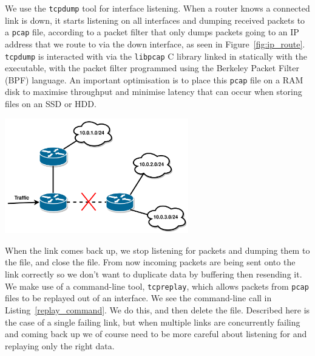 \documentclass[withindex,glossary,openany]{cam-thesis}
\begin{document}
We use the \texttt{tcpdump} tool for interface listening. When a router knows a connected link is down, it starts listening on all interfaces and dumping received packets to a \texttt{pcap} file, according to a packet filter that only dumps packets going to an IP address that we route to via the down interface, as seen in Figure~\ref{fig:ip_route}. \texttt{tcpdump} is interacted with via the \texttt{libpcap} C library linked in statically with the executable, with the packet filter programmed using the Berkeley Packet Filter (BPF) language. An important optimisation is to place this \texttt{pcap} file on a RAM disk to maximise throughput and minimise latency that can occur when storing files on an SSD or HDD.

\begin{center}
\begin{minipage}{0.9\textwidth} \centering
	\includegraphics[width=0.6\textwidth]{ip_route}
	\label{fig:ip_route}
\end{minipage}
\end{center}

When the link comes back up, we stop listening for packets and dumping them to the file, and close the file. From now incoming packets are being sent onto the link correctly so we don't want to duplicate data by buffering then resending it. We make use of a command-line tool, \texttt{tcpreplay}, which allows packets from \texttt{pcap} files to be replayed out of  an interface. We see the command-line call in Listing~\ref{replay_command}. We do this, and then delete the file. Described here is the case of a single failing link, but when multiple links are concurrently failing and coming back up we of course need to be more careful about listening for and replaying only the right data.
\end{document}
